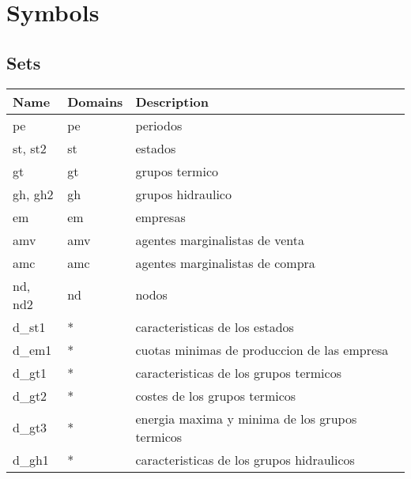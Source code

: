 \documentclass[11pt]{article}
\begin{document}
\section*{Symbols}
\subsection*{Sets}
\begin{tabular}{|l|l|l|} 
\hline 
\textbf{Name} & \textbf{Domains} & \textbf{Description}\\ 
\hline 
 
pe & pe & periodos \\ 
st, st2 & st & estados \\ 
gt & gt & grupos termico \\ 
gh, gh2 & gh & grupos hidraulico \\ 
em & em & empresas \\ 
amv & amv & agentes marginalistas de venta \\ 
amc & amc & agentes marginalistas de compra \\ 
nd, nd2 & nd & nodos \\ 
d\_st1 & * & caracteristicas de los estados \\ 
d\_em1 & * & cuotas minimas de produccion de las empresa \\ 
d\_gt1 & * & caracteristicas de los grupos termicos \\ 
d\_gt2 & * & costes de los grupos termicos \\ 
d\_gt3 & * & energia maxima y minima de los  grupos termicos \\ 
d\_gh1 & * & caracteristicas de los grupos hidraulicos \\ 
\hline 
\end{tabular}
\end{document}
